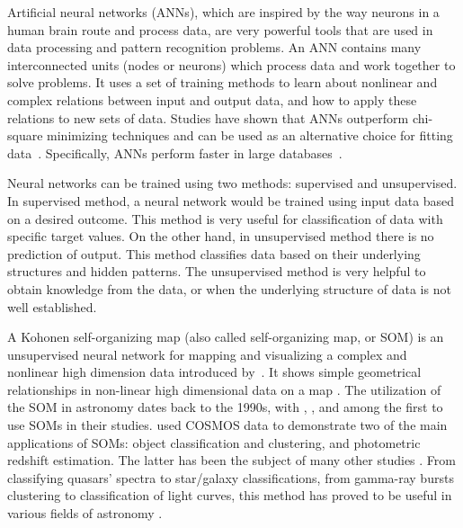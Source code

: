 Artificial neural networks (ANNs), which are inspired by the way neurons in a human brain route and process data, are very powerful tools that are used in data processing and pattern recognition problems.
An ANN contains many interconnected units (nodes or neurons) which process data and work together to solve problems.
It uses a set of training methods to learn about nonlinear and complex relations between input and output data, and how to apply these relations to new sets of data.
Studies have shown that ANNs outperform chi-square minimizing techniques and can be used as an alternative choice for fitting data~\citep[e.g.][]{Marquez91,Moayed09}.
Specifically, ANNs perform faster in large databases~\citep[][]{Gulati97}.

Neural networks can be trained using two methods: supervised and unsupervised.
In supervised method, a neural network would be trained using input data based on a desired outcome.
This method is very useful for classification of data with specific target values.%
On the other hand, in unsupervised method there is no prediction of output.
This method classifies data based on their underlying structures and hidden patterns.
The unsupervised method is very helpful to obtain knowledge from the data, or when the underlying structure of data is not well established.%

A Kohonen self-organizing map (also called self-organizing map, or SOM) is an unsupervised neural network for mapping and visualizing a complex and nonlinear high dimension data introduced by~\citet{Kohonen82}.
It shows simple geometrical relationships in non-linear high dimensional data on a map \citep{Kohonen98}.
The utilization of the SOM in astronomy dates back to the 1990s, with \citet[][]{Odewahn92}, \citet[][]{Hernandez94}, and \citet[][]{Murtagh95} among the first to use SOMs in their studies.
\citet{Geach12} used COSMOS data to demonstrate two of the main applications of SOMs: object classification and clustering, and photometric redshift estimation. The latter has been the subject of many other studies \citep[e.g.][]{Kind14a}.
From classifying quasars' spectra to star/galaxy classifications, from gamma-ray bursts clustering to classification of light curves, this method has proved to be useful in various fields of astronomy \citep[e.g.][]{Maehoenen95, Miller96,Andreon00,Balastegui01,Rajaniemi02,Brett04,Scaringi09}.


